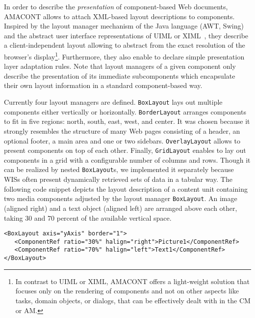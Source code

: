 \documentclass[oribibl]{llncs}
\begin{document}

In order to describe the \emph{presentation} of component-based Web documents, 
AMACONT allows to attach XML-based layout descriptions \cite{amacont:jwe} 
to components. 
Inspired by the layout manager mechanism of the Java language (AWT, Swing) 
and the abstract user interface representations of UIML or 
XIML~\cite{souchon2003}, they describe a client-independent layout 
allowing to abstract from the exact resolution of the browser's 
display\footnote{In contrast to UIML or XIML, AMACONT offers a light-weight 
solution that focuses only on the rendering of components and not on other 
aspects like tasks, domain objects, or dialogs, that can be effectively dealt with in the CM or AM.}. 
Furthermore, they also enable to declare simple presentation layer adaptation rules.
Note that layout managers of a given component only describe the presentation of its immediate subcomponents which 
encapsulate their own layout information in a standard component-based way.

Currently four layout managers are defined.
\texttt{BoxLayout} lays out multiple components either vertically or horizontally. 
\texttt{BorderLayout} arranges components to fit in five regions: north, south, east, west, and center. 
It was chosen because it strongly resembles the structure of many Web pages consisting of a header, an optional footer, a main area and one or two sidebars.
\texttt{OverlayLayout} allows to present components on top of each other. 
Finally, \texttt{GridLayout} enables to lay out components in a grid with a configurable number of columns and rows.
Though it can be realized by nested \texttt{BoxLayout}s, we implemented it separately because WISs often present dynamically retrieved sets of data in a tabular way.
The following code snippet depicts the layout description of a content unit containing two media components adjusted by the layout manager \texttt{BoxLayout}. 
An image (aligned right) and a text object (aligned left) are arranged above each other, taking 30 and 70 percent of the available vertical space.

{\small
\begin{verbatim}
<BoxLayout axis="yAxis" border="1">
   <ComponentRef ratio="30%" halign="right">Picture1</ComponentRef>
   <ComponentRef ratio="70%" halign="left">Text1</ComponentRef>
</BoxLayout>
\end{verbatim}
}
\end{document}
